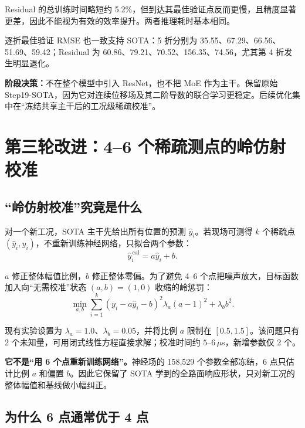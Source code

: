 \documentclass[11pt,a4paper]{article}
\begin{document}
Residual 的总训练时间略短约 5.2\%，但到达其最佳验证点反而更慢，且精度显著更差，因此不能视为有效的效率提升。两者推理耗时基本相同。

逐折最佳验证 RMSE 也一致支持 SOTA：5 折分别为 35.55、67.29、66.56、51.69、59.42；Residual 为 60.86、79.21、70.52、156.35、74.56，尤其第 4 折发生明显退化。

\begin{conclusionbox}
\textbf{阶段决策：}不在整个模型中引入 ResNet，也不把 MoE 作为主干。保留原始 Step19-SOTA，因为它对连续位移场及其二阶导数的联合学习更稳定。后续优化集中在“冻结共享主干后的工况级稀疏校准”。
\end{conclusionbox}

\section{第三轮改进：4--6 个稀疏测点的岭仿射校准}

\subsection{“岭仿射校准”究竟是什么}

对一个新工况，SOTA 主干先给出所有位置的预测 $\hat y_i$。若现场可测得 $k$ 个稀疏点 $(\hat y_i,y_i)$，不重新训练神经网络，只拟合两个参数：
\begin{equation}
\hat y_i^{\,\mathrm{cal}}=a\hat y_i+b.
\end{equation}

$a$ 修正整体幅值比例，$b$ 修正整体零偏。为了避免 4--6 个点把噪声放大，目标函数加入向“无需校准”状态 $(a,b)=(1,0)$ 收缩的岭惩罚：
\begin{equation}
\min_{a,b}
\sum_{i=1}^{k}(y_i-a\hat y_i-b)^2
\lambda_a(a-1)^2+\lambda_b b^2.
\label{eq:ridge}
\end{equation}

现有实验设置为 $\lambda_a=1.0$、$\lambda_b=0.05$，并将比例 $a$ 限制在 $[0.5,1.5]$。该问题只有 2 个未知量，可用闭式线性方程直接求解；校准时间约 $5$--$6\,\mu$s，新增参数仅 2 个。

\begin{methodbox}
\textbf{它不是“用 6 个点重新训练网络”。}神经场的 158,529 个参数全部冻结，6 点只估计比例 $a$ 和偏置 $b$。因此它保留了 SOTA 学到的全路面响应形状，只对新工况的整体幅值和基线做小幅纠正。
\end{methodbox}

\subsection{为什么 6 点通常优于 4 点}
\end{document}
